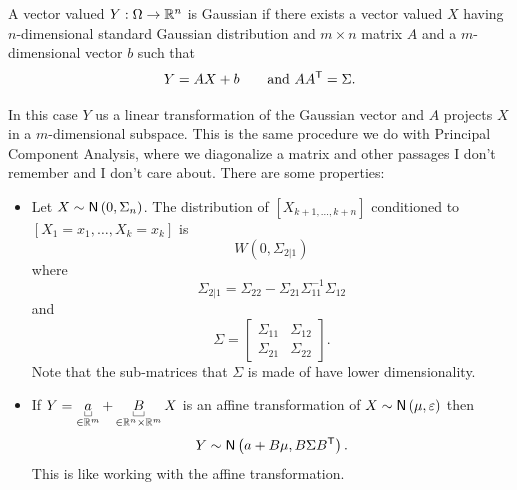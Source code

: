 \documentclass{report}
\begin{document}
\begin{definition}
	A vector valued \rv $Y:\Omega\to\mathbb{R}^{n}$ is Gaussian if there exists a vector valued $X$ having $n$-dimensional standard Gaussian distribution and $m\times n$ matrix $A$ and a $m$-dimensional vector $b$ such that
	\begin{equation*}
		Y=AX+b\qquad\text{and }AA^{\mathsf{T}}=\Sigma.
	\end{equation*}
\end{definition}
In this case $Y$ us a linear transformation of the Gaussian vector and $A$ projects $X$ in a $m$-dimensional subspace. This is the same procedure we do with Principal Component Analysis, where we diagonalize a matrix and other passages I don't remember and I don't care about.
There are some properties:
\begin{proposition}
	\begin{itemize}
		\item Let $X\sim\mathsf{N}\left(0,\Sigma_{n}\right)$. The distribution of $\left[X_{k+1,\ldots,k+n}\right]$ conditioned to $\left[X_{1}=x_{1},\ldots,X_{k}=x_{k}\right]$ is \begin{equation*}
		W(0,\Sigma_{2|1})
		\end{equation*}
		where 
		\begin{equation*}
			\Sigma_{2|1}=\Sigma_{22}-\Sigma_{21}\Sigma_{11}^{-1}\Sigma_{12}
		\end{equation*}
		and 
		\begin{equation*}
			\Sigma=\begin{bmatrix}
				\Sigma_{11}&\Sigma_{12}\\
				\Sigma_{21}&\Sigma_{22}
			\end{bmatrix}.
		\end{equation*}
		Note that the sub-matrices that $\Sigma$ is made of have lower dimensionality.
		\item If $Y=\ubracketthin{a}_{\in\R^{m}}+\ubracketthin{B}_{\in\R^{n}\times\R^{m}}X$ is an affine transformation of $X\sim\mathsf{N}\left(\mu,\varepsilon\right)$ then $$Y\sim\mathsf{N}\left(a+B\mu, B\Sigma B^{\mathsf{T}}\right).$$
		This is like working with the affine transformation.
	\end{itemize}
\end{proposition}
\clearpage
\listoffigures  
\end{document}
